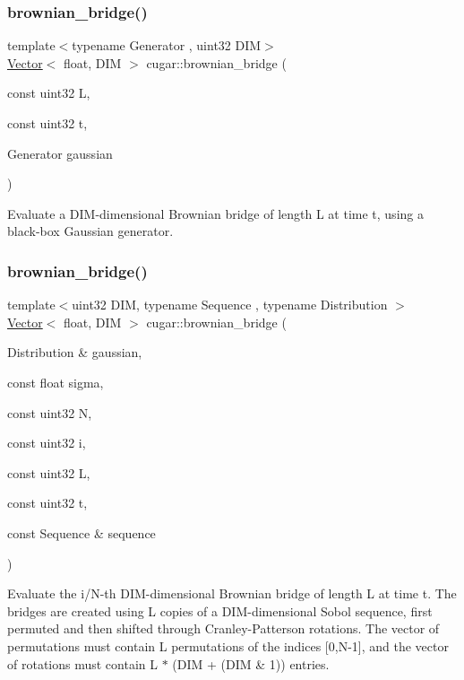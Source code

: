 \subsubsection{\texorpdfstring{brownian\+\_\+bridge()}{brownian\_bridge()}\hspace{0.1cm}{\footnotesize\ttfamily [1/2]}}
{\footnotesize\ttfamily template$<$typename Generator , uint32 D\+IM$>$ \\
\hyperlink{structcugar_1_1_vector}{Vector}$<$ float, D\+IM $>$ cugar\+::brownian\+\_\+bridge (\begin{DoxyParamCaption}\item[{const uint32}]{L,  }\item[{const uint32}]{t,  }\item[{Generator}]{gaussian }\end{DoxyParamCaption})}

Evaluate a D\+I\+M-\/dimensional Brownian bridge of length L at time t, using a black-\/box Gaussian generator. \mbox{\label{group__processes_ga804d942e70bf4d755991fc3393004e8e}} 
\subsubsection{\texorpdfstring{brownian\+\_\+bridge()}{brownian\_bridge()}\hspace{0.1cm}{\footnotesize\ttfamily [2/2]}}
{\footnotesize\ttfamily template$<$uint32 D\+IM, typename Sequence , typename Distribution $>$ \\
\hyperlink{structcugar_1_1_vector}{Vector}$<$ float, D\+IM $>$ cugar\+::brownian\+\_\+bridge (\begin{DoxyParamCaption}\item[{Distribution \&}]{gaussian,  }\item[{const float}]{sigma,  }\item[{const uint32}]{N,  }\item[{const uint32}]{i,  }\item[{const uint32}]{L,  }\item[{const uint32}]{t,  }\item[{const Sequence \&}]{sequence }\end{DoxyParamCaption})}

Evaluate the i/\+N-\/th D\+I\+M-\/dimensional Brownian bridge of length L at time t. The bridges are created using L copies of a D\+I\+M-\/dimensional Sobol sequence, first permuted and then shifted through Cranley-\/\+Patterson rotations. The vector of permutations must contain L permutations of the indices \mbox{[}0,N-\/1\mbox{]}, and the vector of rotations must contain L $\ast$ (D\+IM + (D\+IM \& 1)) entries. \mbox{\label{group__processes_ga9f3fe90d8a07d266c41f239963b83644}} 
